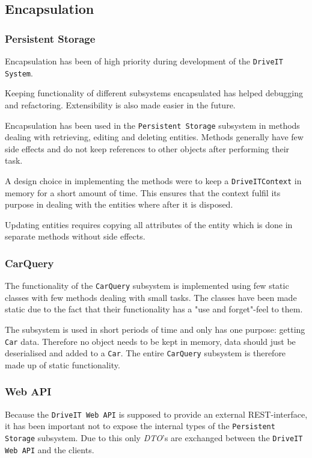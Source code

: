 \subsection{Encapsulation}
\subsubsection{Persistent Storage}
Encapsulation has been of high priority during development of the \texttt{DriveIT System}. 

Keeping functionality of different subsystems encapsulated has helped debugging and refactoring. Extensibility is also made easier in the future.

Encapsulation has been used in the \texttt{Persistent Storage} subsystem in methods dealing with retrieving, editing and deleting entities. Methods generally have few side effects and do not keep references to other objects after performing their task.

A design choice in implementing the methods were to keep a \texttt{DriveITContext} in memory for a short amount of time. This ensures that the context fulfil its purpose in dealing with the entities where after it is disposed.

Updating entities requires copying all attributes of the entity which is done in separate methods without side effects.

\subsubsection{CarQuery}
The functionality of the \texttt{CarQuery} subsystem is implemented using few static classes with few methods dealing with small tasks. The classes have been made static due to the fact that their functionality has a "use and forget"-feel to them. 

The subsystem is used in short periods of time and only has one purpose: getting \texttt{Car} data. Therefore no object needs to be kept in memory, data should just be deserialised and added to a \texttt{Car}. The entire \texttt{CarQuery} subsystem is therefore made up of static functionality.

\subsubsection{Web API}
Because the \texttt{DriveIT Web API} is supposed to provide an external REST-interface, it has been important not to expose the internal types of the \texttt{Persistent Storage} subsystem. Due to this only \textit{DTO}'s are exchanged between the \texttt{DriveIT Web API} and the clients.\\

